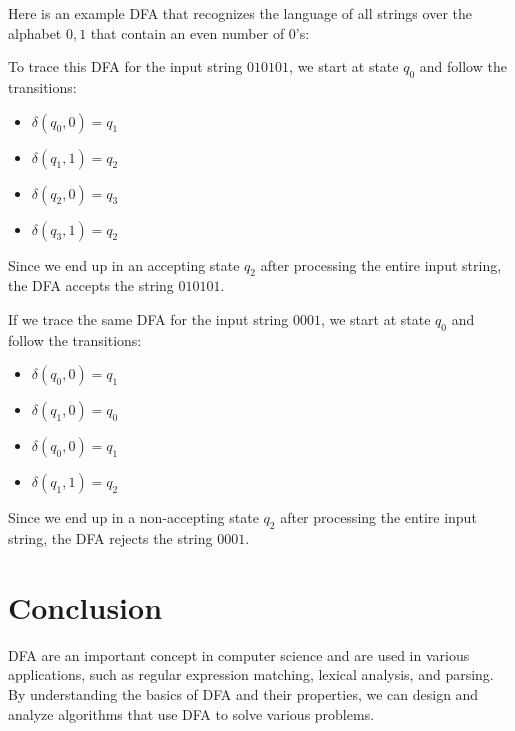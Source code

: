 \documentclass{article}
\begin{document}
Here is an example DFA that recognizes the language of all strings over the alphabet ${0,1}$ that contain an even number of 0's:

\begin{center}
\end{center}

To trace this DFA for the input string $010101$, we start at state $q_0$ and follow the transitions:

\begin{itemize}
\item $\delta(q_0,0) = q_1$
\item $\delta(q_1,1) = q_2$
\item $\delta(q_2,0) = q_3$
\item $\delta(q_3,1) = q_2$
\end{itemize}

Since we end up in an accepting state $q_2$ after processing the entire input string, the DFA accepts the string $010101$.

If we trace the same DFA for the input string $0001$, we start at state $q_0$ and follow the transitions:

\begin{itemize}
\item $\delta(q_0,0) = q_1$
\item $\delta(q_1,0) = q_0$
\item $\delta(q_0,0) = q_1$
\item $\delta(q_1,1) = q_2$
\end{itemize}

Since we end up in a non-accepting state $q_2$ after processing the entire input string, the DFA rejects the string $0001$.

\section{Conclusion}

DFA are an important concept in computer science and are used in various applications, such as regular expression matching, lexical analysis, and parsing. By understanding the basics of DFA and their properties, we can design and analyze algorithms that use DFA to solve various problems.
\end{document}
